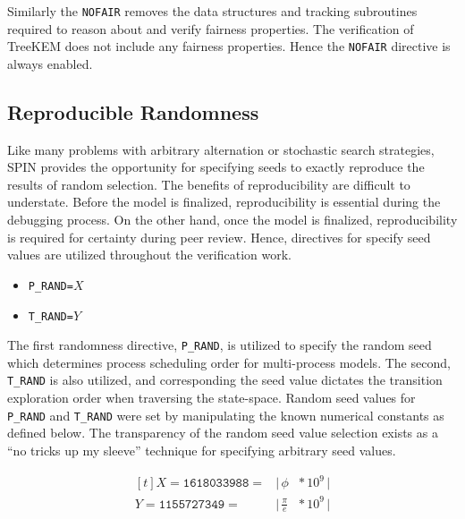 Similarly the \texttt{NOFAIR} removes the data structures and tracking subroutines required to reason about and verify fairness properties.
The verification of TreeKEM does not include any fairness properties.
Hence the \texttt{NOFAIR} directive is always enabled.

\hypertarget{reproducible-randomness}{%
\subsection{Reproducible Randomness}\label{reproducible-randomness}}

Like many problems with arbitrary alternation or stochastic search strategies, SPIN provides the opportunity for specifying seeds to exactly reproduce the results of random selection.
The benefits of reproducibility are difficult to understate.
Before the model is finalized, reproducibility is essential during the debugging process.
On the other hand, once the model is finalized, reproducibility is required for certainty during peer review.
Hence, directives for specify seed values are utilized throughout the verification work.

\begin{itemize}
\item
  \texttt{P\_RAND=}\(X\)
\item
  \texttt{T\_RAND=}\(Y\)
\end{itemize}

The first randomness directive, \texttt{P\_RAND}, is utilized to specify the random seed which determines process scheduling order for multi-process models.
The second, \texttt{T\_RAND} is also utilized, and corresponding the seed value dictates the transition exploration order when traversing the state-space.
Random seed values for \texttt{P\_RAND} and \texttt{T\_RAND} were set by manipulating the known numerical constants as defined below.
The transparency of the random seed value selection exists as a ``no tricks up my sleeve'' technique for specifying arbitrary seed values.

\begin{equation}
\begin{aligned}[t]
X = \texttt{1618033988} = & \bigg | \, \phi          \!\!\!\! & * \, 10^9 \, \bigg |\\
Y = \texttt{1155727349} = & \bigg | \, \frac{\pi}{e} \!\!\!\! & * \, 10^9 \, \bigg |\\
\end{aligned}
\end{equation}

